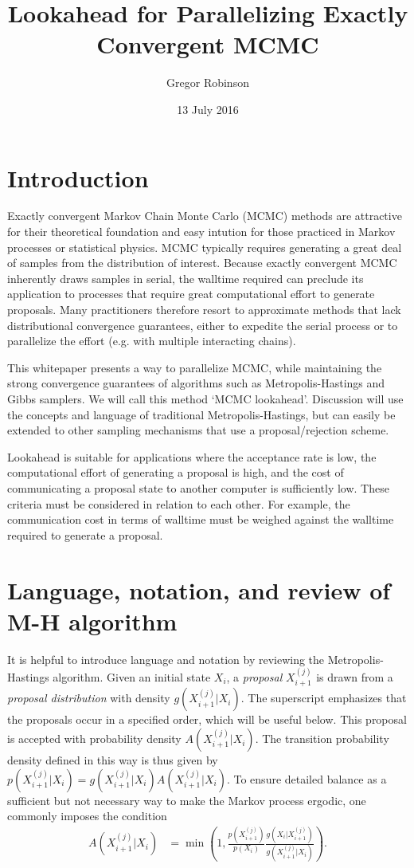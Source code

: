\documentclass[10pt]{article}
\title{Lookahead for Parallelizing Exactly Convergent MCMC}
\author{Gregor Robinson}
\date{13 July 2016}
\begin{document}
\maketitle

\section{Introduction}
Exactly convergent Markov Chain Monte Carlo (MCMC) methods are attractive for their theoretical foundation and easy intution for those practiced in Markov processes or statistical physics.
MCMC typically requires generating a great deal of samples from the distribution of interest.
Because exactly convergent MCMC inherently draws samples in serial, the walltime required can preclude its application to processes that require great computational effort to generate proposals.
Many practitioners therefore resort to approximate methods that lack distributional convergence guarantees, either to expedite the serial process or to parallelize the effort (e.g. with multiple interacting chains).

This whitepaper presents a way to parallelize MCMC, while maintaining the strong convergence guarantees of algorithms such as Metropolis-Hastings and Gibbs samplers.
We will call this method `MCMC lookahead'.
Discussion will use the concepts and language of traditional Metropolis-Hastings, but can easily be extended to other sampling mechanisms that use a proposal/rejection scheme.

Lookahead is suitable for applications where the acceptance rate is low, the computational effort of generating a proposal is high, and the cost of communicating a proposal state to another computer is sufficiently low.
These criteria must be considered in relation to each other.
For example, the communication cost in terms of walltime must be weighed against the walltime required to generate a proposal.

\section{Language, notation, and review of M-H algorithm}
It is helpful to introduce language and notation by reviewing the Metropolis-Hastings algorithm.
Given an initial state $X_i$, a \emph{proposal} $X_{i+1}^{(j)}$ is drawn from a \emph{proposal distribution} with density $g(X_{i+1}^{(j)} | X_i)$.
The superscript emphasizes that the proposals occur in a specified order, which will be useful below.
This proposal is accepted with probability density $A(X_{i+1}^{(j)} | X_i)$.
The transition probability density defined in this way is thus given by $p(X_{i+1}^{(j)} | X_i) = g(X_{i+1}^{(j)} | X_i) A(X_{i+1}^{(j)} | X_i)$.
To ensure detailed balance as a sufficient but not necessary way to make the Markov process ergodic, one commonly imposes the condition
\begin{align*}
    A(X_{i+1}^{(j)} | X_i) &= \min \left( 1, \frac{p(X_{i+1}^{(j)})}{p(X_{i})} \frac{g(X_i | X_{i+1}^{(j)})}{g(X_{i+1}^{(j)} | X_i)} \right).
\end{align*}
\end{document}
